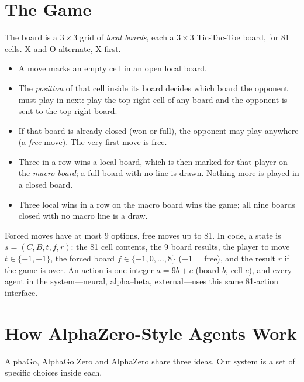 \documentclass[conference]{IEEEtran}
\begin{document}
\section{The Game}
\label{sec:game}

The board is a $3\times3$ grid of \emph{local boards}, each a $3\times3$
Tic-Tac-Toe board, for 81 cells. X and O alternate, X first.
\begin{itemize}\setlength{\itemsep}{0pt}
  \item A move marks an empty cell in an open local board.
  \item The \emph{position} of that cell inside its board decides which
        board the opponent must play in next: play the top-right cell of any
        board and the opponent is sent to the top-right board.
  \item If that board is already closed (won or full), the opponent may
        play anywhere (a \emph{free} move). The very first move is free.
  \item Three in a row wins a local board, which is then marked for that
        player on the \emph{macro board}; a full board with no line is
        drawn. Nothing more is played in a closed board.
  \item Three local wins in a row on the macro board wins the game; all
        nine boards closed with no macro line is a draw.
\end{itemize}
Forced moves have at most 9 options, free moves up to 81. In code, a state is $s=(C,B,t,f,r)$: the 81 cell
contents, the 9 board results, the player to move $t\in\{-1,+1\}$, the
forced board $f\in\{-1,0,\dots,8\}$ ($-1$ = free), and the result $r$ if the
game is over. An action is one integer $a=9b+c$ (board $b$, cell $c$), and
every agent in the system---neural, alpha--beta, external---uses this same
81-action interface.

\section{How AlphaZero-Style Agents Work}
\label{sec:background}

AlphaGo, AlphaGo Zero and AlphaZero
\cite{silver2016alphago,silver2017alphagozero,silver2017alphazero} share
three ideas. Our system is a set of specific choices inside each.
\end{document}
